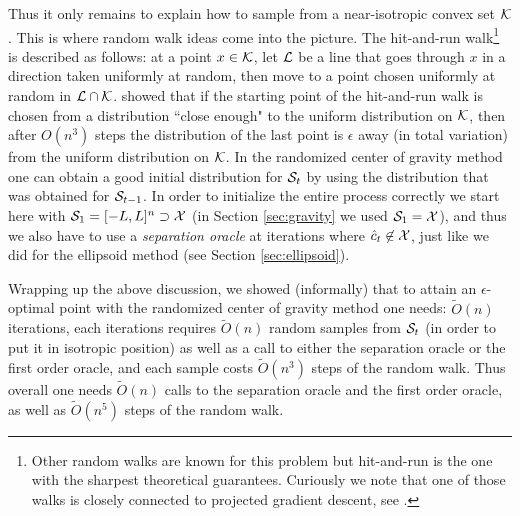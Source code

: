 Thus it only remains to explain how to sample from a near-isotropic convex set $\mathcal{K}$. This is where random walk ideas come into the picture. The hit-and-run walk\footnote{Other random walks are known for this problem but hit-and-run is the one with the sharpest theoretical guarantees. Curiously we note that one of those walks is closely connected to projected gradient descent, see \cite{BEL15}.} is described as follows: at a point $x \in \mathcal{K}$, let $\mathcal{L}$ be a line that goes through $x$ in a direction taken uniformly at random, then move to a point chosen uniformly at random in $\mathcal{L} \cap \mathcal{K}$. \cite{Lov98} showed that if the starting point of the hit-and-run walk is chosen from a distribution ``close enough" to the uniform distribution on $\mathcal{K}$, then after $O(n^3)$ steps the distribution of the last point is $\epsilon$ away (in total variation) from the uniform distribution on $\mathcal{K}$. In the randomized center of gravity method one can obtain a good initial distribution for $\mathcal{S}_t$ by using the distribution that was obtained for $\mathcal{S}_{t-1}$. In order to initialize the entire process correctly we start here with $\mathcal{S}_1 = [-L, L]^n \supset \mathcal{X}$ (in Section \ref{sec:gravity} we used $\mathcal{S}_1 = \mathcal{X}$), and thus we also have to use a {\em separation oracle} at iterations where $\hat{c}_t \not\in \mathcal{X}$, just like we did for the ellipsoid method (see Section \ref{sec:ellipsoid}).

Wrapping up the above discussion, we showed (informally) that to attain an $\epsilon$-optimal point with the randomized center of gravity method one needs: $\tilde{O}(n)$ iterations, each iterations requires $\tilde{O}(n)$ random samples from $\mathcal{S}_t$ (in order to put it in isotropic position) as well as a call to either the separation oracle or the first order oracle, and each sample costs $\tilde{O}(n^3)$ steps of the random walk. Thus overall one needs $\tilde{O}(n)$ calls to the separation oracle and the first order oracle, as well as $\tilde{O}(n^5)$ steps of the random walk.